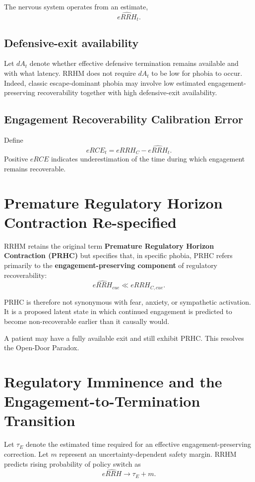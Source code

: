 \documentclass[11pt]{article}
\begin{document}
The nervous system operates from an estimate,
\[
\widehat{eRRH}_t.
\]

\subsection{Defensive-exit availability}
Let $dA_t$ denote whether effective defensive termination remains available and with what latency. RRHM does not require $dA_t$ to be low for phobia to occur. Indeed, classic escape-dominant phobia may involve low estimated engagement-preserving recoverability together with high defensive-exit availability.

\subsection{Engagement Recoverability Calibration Error}
Define
\[
eRCE_t=eRRH_C-\widehat{eRRH}_t.
\]
Positive $eRCE$ indicates underestimation of the time during which engagement remains recoverable.

\section{Premature Regulatory Horizon Contraction Re-specified}

RRHM retains the original term \textbf{Premature Regulatory Horizon Contraction (PRHC)} but specifies that, in specific phobia, PRHC refers primarily to the \textbf{engagement-preserving component} of regulatory recoverability:
\[
\widehat{eRRH}_{cue}\ll eRRH_{C,cue}.
\]

PRHC is therefore not synonymous with fear, anxiety, or sympathetic activation. It is a proposed latent state in which continued engagement is predicted to become non-recoverable earlier than it causally would.

A patient may have a fully available exit and still exhibit PRHC. This resolves the Open-Door Paradox.

\section{Regulatory Imminence and the Engagement-to-Termination Transition}

Let $\tau_E$ denote the estimated time required for an effective engagement-preserving correction. Let $m$ represent an uncertainty-dependent safety margin. RRHM predicts rising probability of policy switch as
\[
\widehat{eRRH}\rightarrow\tau_E+m.
\]
\end{document}
